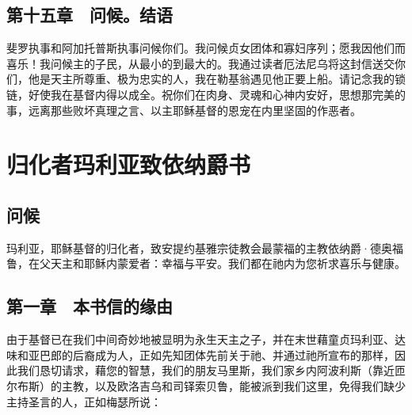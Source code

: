 
\subsection{第十五章　问候。结语}

斐罗执事和阿加托普斯执事问候你们。我问候贞女团体和寡妇序列；愿我因他们而喜乐！我问候主的子民，从最小的到最大的。我通过读者厄法尼乌将这封信送交你们，他是天主所尊重、极为忠实的人，我在勒基翁遇见他正要上船。请记念我的锁链，好使我在基督内得以成全。祝你们在肉身、灵魂和心神内安好，思想那完美的事，远离那些败坏真理之言、以主耶稣基督的恩宠在内里坚固的作恶者。\par


\section{归化者玛利亚致依纳爵书}


\subsection{问候}

玛利亚，耶稣基督的归化者，致安提约基雅宗徒教会最蒙福的主教依纳爵·德奥福鲁，在父天主和耶稣内蒙爱者：幸福与平安。我们都在祂内为您祈求喜乐与健康。\par


\subsection{第一章　本书信的缘由}

由于基督已在我们中间奇妙地被显明为永生天主之子，并在末世藉童贞玛利亚、达味和亚巴郎的后裔成为人，正如先知团体先前关于祂、并通过祂所宣布的那样，因此我们恳切请求，藉您的智慧，我们的朋友马里斯，我们家乡内阿波利斯（靠近匝尔布斯）的主教，以及欧洛吉乌和司铎索贝鲁，能被派到我们这里，免得我们缺少主持圣言的人，正如梅瑟所说：\par

